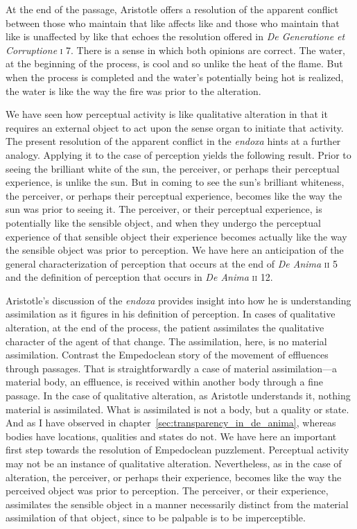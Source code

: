 At the end of the passage, Aristotle offers a resolution of the apparent conflict between those who maintain that like affects like and those who maintain that like is unaffected by like that echoes the resolution offered in \emph{De Generatione et Corruptione} \textsc{i} 7. There is a sense in which both opinions are correct. The water, at the beginning of the process, is cool and so unlike the heat of the flame. But when the process is completed and the water's potentially being hot is realized, the water is like the way the fire was prior to the alteration. 

We have seen how perceptual activity is like qualitative alteration in that it requires an external object to act upon the sense organ to initiate that activity. The present resolution of the apparent conflict in the \emph{endoxa} hints at a further analogy. Applying it to the case of perception yields the following result. Prior to seeing the brilliant white of the sun, the perceiver, or perhaps their perceptual experience, is unlike the sun. But in coming to see the sun's brilliant whiteness, the perceiver, or perhaps their perceptual experience, becomes like the way the sun was prior to seeing it. The perceiver, or their perceptual experience, is potentially like the sensible object, and when they undergo the perceptual experience of that sensible object their experience becomes actually like the way the sensible object was prior to perception. We have here an anticipation of the general characterization of perception that occurs at the end of \emph{De Anima} \textsc{ii} 5 and the definition of perception that occurs in \emph{De Anima} \textsc{ii} 12.

Aristotle's discussion of the \emph{endoxa} provides insight into how he is understanding assimilation as it figures in his definition of perception. In cases of qualitative alteration, at the end of the process, the patient assimilates the qualitative character of the agent of that change. The assimilation, here, is no material assimilation. Contrast the Empedoclean story of the movement of effluences through passages. That is straightforwardly a case of material assimilation---a material body, an effluence, is received within another body through a fine passage. In the case of qualitative alteration, as Aristotle understands it, nothing material is assimilated. What is assimilated is not a body, but a quality or state. And as I have observed in chapter~\ref{sec:transparency_in_de_anima}, whereas bodies have locations, qualities and states do not. We have here an important first step towards the resolution of Empedoclean puzzlement. Perceptual activity may not be an instance of qualitative alteration. Nevertheless, as in the case of alteration, the perceiver, or perhaps their experience, becomes like the way the perceived object was prior to perception. The perceiver, or their experience, assimilates the sensible object in a manner necessarily distinct from the material assimilation of that object, since to be palpable is to be imperceptible.


